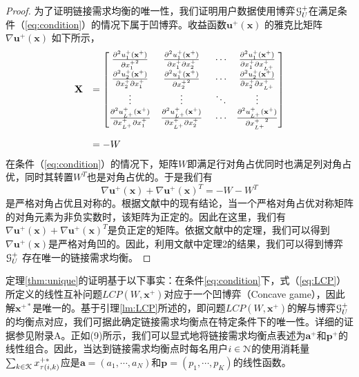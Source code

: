 \begin{proof}
为了证明链接需求均衡的唯一性，我们证明用户数据使用博弈$\mathcal{G}_U^+$在满足条件（\ref{eq:condition}）的情况下属于凹博弈。收益函数$\mathbf{u}^+(\mathbf{x})$ 的雅克比矩阵$\nabla\mathbf{u}^+(\mathbf{x})$ 如下所示， 
\begin{equation}
\begin{array}
[c]{lll}%
\mathbf{X}&=
  \begin{bmatrix}
   \frac{\partial^2u_1^+(\mathbf{x}^+)}{{\partial x^{+}_1}^2}  &  \frac{\partial^2u_1^+(\mathbf{x}^+)}{\partial x^{+}_1\partial x^{+}_2}  &  ~\cdots  &  \frac{\partial^2u_1^+(\mathbf{x}^+)}{\partial x^{+}_1\partial x^{+}_{L^+}}\\
   \frac{\partial^2u_2^+(\mathbf{x}^+)}{\partial x^{+}_2\partial x^{+}_1}  &  \frac{\partial^2u_1^+(\mathbf{x}^+)}{{\partial x^{+}_2}^2}  &  ~\cdots  &  \frac{\partial^2u_2^+(\mathbf{x}^+)}{\partial x^{+}_2\partial x^{+}_{L^+}}\\
    \vdots  &  \vdots  &  ~\ddots  &  \vdots\\
   \frac{\partial^2u_{L^+}^+(\mathbf{x}^+)}{\partial x^{+}_{L^+}\partial x^{+}_1}  &  \frac{\partial^2u_{L^+}^+(\mathbf{x}^+)}{\partial x^{+}_{L^+}\partial x^{+}_2}  &  ~\cdots  &  \frac{\partial^2u_{L^+}^+(\mathbf{x}^+)}{{\partial x^{+}_{L^+}}^2}\\
  \end{bmatrix}\\[45pt]  
  &=-W
\end{array}
\end{equation}
在条件（\ref{eq:condition}）的情况下，矩阵$W$即满足行对角占优同时也满足列对角占优，同时其转置$W^T$也是对角占优的。于是我们有
\begin{equation}
 \nabla\mathbf{u}^+(\mathbf{x}) + \nabla\mathbf{u}^+(\mathbf{x})^T = -W - W^T
\end{equation}
是严格对角占优且对称的。根据文献\cite{Horn85}中的现有结论，当一个严格对角占优对称矩阵的对角元素为非负实数时，该矩阵为正定的。因此在这里，我们有$\nabla\mathbf{u}^+(\mathbf{x}) + \nabla\mathbf{u}^+(\mathbf{x})^T$是负正定的矩阵。依据文献\cite{econometrica}中的定理，我们可以得到$\nabla\mathbf{u}^+(\mathbf{x})$是严格对角凹的。因此，利用文献\cite{econometrica}中定理2的结果，我们可以得到博弈$\mathcal{G}_U^+$ 存在唯一的链接需求均衡。
\end{proof}
定理\ref{thm:unique}的证明基于以下事实：在条件\ref{eq:condition}下，式（\ref{eq:LCP}）所定义的线性互补问题$LCP(W,\mathbf{x}^{+})$对应于一个凹博弈（Concave game），因此解$\mathbf{x}^{+*}$是唯一的。基于引理\ref{lm:LCP}所述的，即问题$LCP(W,\mathbf{x}^{+})$的解与博弈$\mathcal{G}_U^{+}$的均衡点对应，我们可据此确定链接需求均衡点在特定条件下的唯一性。详细的证据参见附录A。正如(9)所示，我们可以显式地将链接需求均衡点表述为$\mathbf{a}^{+}$和$\mathbf{p}^{+}$的线性组合。因此，当达到链接需求均衡点时每名用户$i\in\mathcal{N}$的使用消耗量$\sum_{k\in\mathcal{K}}x^{+*}_{\tau(i,k)}$应是$\mathbf{a}=(a_1,\cdots,a_N)$和$\mathbf{p}=(p_1,\cdots,p_K)$的线性函数。

